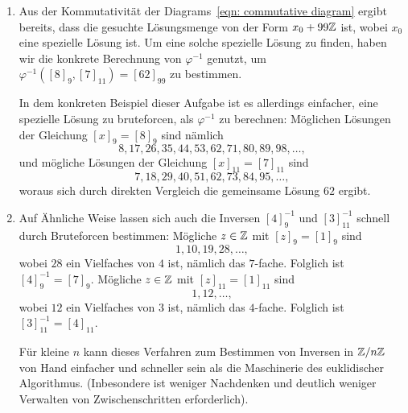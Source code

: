 \documentclass[a4paper,10pt,numbers=noenddot]{scrartcl}
\begin{document}
\begin{remark}
  \begin{enumerate}
    \item
      Aus der Kommutativität der Diagrams~\eqref{eqn: commutative diagram} ergibt bereits, dass die gesuchte Lösungsmenge von der Form $x_0 + 99\mathbb{Z}$ ist, wobei $x_0$ eine spezielle Lösung ist.
      Um eine solche spezielle Lösung zu finden, haben wir die konkrete Berechnung von $\varphi^{-1}$ genutzt, um $\varphi^{-1}([8]_9, [7]_{11}) = [62]_{99}$ zu bestimmen.
      
      In dem konkreten Beispiel dieser Aufgabe ist es allerdings einfacher, eine spezielle Lösung zu bruteforcen, als $\varphi^{-1}$ zu berechnen:
      Möglichen Lösungen der Gleichung $[x]_9 = [8]_9$ sind nämlich
      \[
        8, 17, 26, 35, 44, 53, 62, 71, 80, 89, 98, \dotsc,
      \]
      und mögliche Lösungen der Gleichung $[x]_{11} = [7]_{11}$ sind
      \[
        7, 18, 29, 40, 51, 62, 73, 84, 95, \dotsc,
      \]
      woraus sich durch direkten Vergleich die gemeinsame Lösung $62$ ergibt.
    \item
      Auf Ähnliche Weise lassen sich auch die Inversen $[4]_9^{-1}$ und $[3]_{11}^{-1}$ schnell durch Bruteforcen bestimmen:
      Mögliche $z \in \mathbb{Z}$ mit $[z]_9 = [1]_9$ sind
      \[
        1, 10, 19, 28, \dotsc,
      \]
      wobei $28$ ein Vielfaches von $4$ ist, nämlich das $7$-fache.
      Folglich ist $[4]_9^{-1} = [7]_9$.
      Mögliche $z \in \mathbb{Z}$ mit $[z]_{11} = [1]_{11}$ sind
      \[
        1, 12, \dotsc,
      \]
      wobei $12$ ein Vielfaches von $3$ ist, nämlich das $4$-fache.
      Folglich ist $[3]_{11}^{-1} = [4]_{11}$.
      
      Für kleine $n$ kann dieses Verfahren zum Bestimmen von Inversen in $\mathbb{Z}/n\mathbb{Z}$ von Hand einfacher und schneller sein als die Maschinerie des euklidischer Algorithmus.
      (Inbesondere ist weniger Nachdenken und deutlich weniger Verwalten von Zwischenschritten erforderlich).
  \end{enumerate}
\end{remark}





\addtocounter{section}{3}





\section{}
\end{document}
